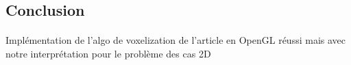 \subsection{Conclusion}

\begin{frame}[fragile=singleslide]{\insertsectionhead}

  \framesubtitle{\insertsubsectionhead}
  {\Large Implémentation de l’algo de voxelization de l’article en OpenGL réussi mais avec notre interprétation pour le problème des cas 2D}
\end{frame}

